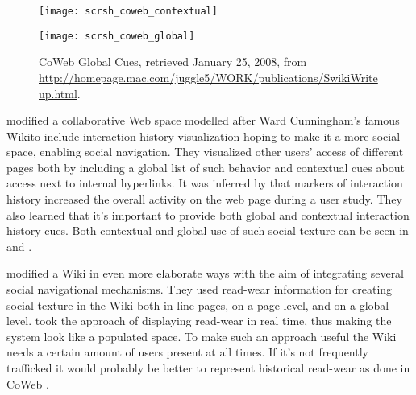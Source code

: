 \begin{figure}
  \captionstyle{\raggedright}
  \begin{whole}
    \begin{minipage}[t]{0.475\wholewidth}
      \texttt{[image: scrsh\_coweb\_contextual]}
      \caption[CoWeb Contextual Cues]{%
        CoWeb Contextual Cues,
        retrieved January 25, 2008, from
        \url{http://homepage.mac.com/juggle5/WORK/publications/SwikiWriteup.html}.
      }
      \label{figure:scrsh.coweb.contextual}
    \end{minipage}
    \hfill
    \begin{minipage}[t]{0.475\wholewidth}
      \texttt{[image: scrsh\_coweb\_global]}
      \caption[CoWeb Global Cues]{%
        CoWeb Global Cues,
        retrieved January 25, 2008, from
        \url{http://homepage.mac.com/juggle5/WORK/publications/SwikiWriteup.html}.
      }
      \label{figure:scrsh.coweb.global}
    \end{minipage}
  \end{whole}
  \normalcaption
\end{figure}

\citet{dieberger00a} modified \dash{}a collaborative Web space
modelled after Ward Cunningham's famous Wiki\dash{}to include interaction
history visualization hoping to make it a more social space, enabling social
navigation. They visualized other users' access of different pages both by
including a global list of such behavior and contextual cues about access
next to internal hyperlinks.
It was inferred by \citeauthor{dieberger00a} that markers of interaction
history increased the overall activity on the web page during a user study.
They also learned that it's important to provide both global and
contextual interaction history cues. Both
contextual and global use of such social texture can be seen in
 and .

\citet{xu06} modified a Wiki in even more elaborate ways
with the aim of integrating several social navigational mechanisms.
They used read-wear information for creating social
texture in the Wiki both in-line pages, on a page level, and on a global
level. \citeauthor{xu06} took the approach of displaying read-wear in real
time, thus making the system look like a populated space. To make such an
approach useful the Wiki needs a certain amount of users present at all times.
If it's not frequently trafficked it would probably be better to represent
historical read-wear as done in CoWeb \citep[]{dieberger00a}.

